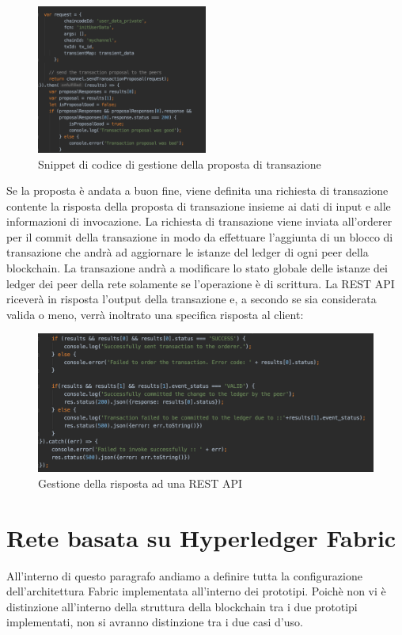 \begin{figure}[h]
    \centering
    \includegraphics[width=0.5\textwidth]{img/proposal-request.png}
    \caption{Snippet di codice di gestione della proposta di transazione}
    \label{proposal-script}
\end{figure}
Se la proposta è andata a buon fine, viene definita una richiesta di transazione contente la risposta della proposta di transazione insieme ai dati di input e alle informazioni di invocazione. La richiesta di transazione viene inviata all'orderer per il commit della transazione in modo da effettuare l'aggiunta di un blocco di transazione che andrà ad aggiornare le istanze del ledger di ogni peer della blockchain. La transazione andrà a modificare lo stato globale delle istanze dei ledger dei peer della rete solamente se l'operazione è di scrittura. La REST API riceverà in risposta l'output della transazione e, a secondo se sia considerata valida o meno, verrà inoltrato una specifica risposta al client: 
\begin{figure}[h]
    \centering
    \includegraphics[width=1\textwidth]{img/response-result.png}
    \caption{Gestione della risposta ad una REST API}
    \label{result-script}
\end{figure}
\newpage
\section{Rete basata su Hyperledger Fabric}
All'interno di questo paragrafo andiamo a definire tutta la configurazione dell'architettura Fabric implementata all'interno dei prototipi. Poichè non vi è distinzione all'interno della struttura della blockchain tra i due prototipi implementati, non si avranno distinzione tra i due casi d'uso.
